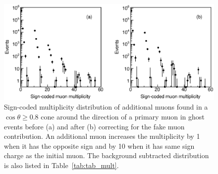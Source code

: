 \documentclass[aps,prd,preprint,floatfix,nofootinbib,superscriptaddress,showpacs,amssymb]{revtex4}
\begin{document}
 \begin{figure}
 \begin{center}
 \vspace{-0.3in}
 \leavevmode
 \includegraphics*[width=\textwidth]{fa0_14_new.eps}
 \caption[]{Sign-coded multiplicity distribution of additional muons found
            in a $\cos \theta \geq 0.8$ cone around the direction of a primary
            muon in ghost events before (a) and after (b) correcting for the
            fake muon contribution. An additional muon increases the 
            multiplicity by 1 when it  has the opposite sign and by 10 when 
            it has same sign charge as the initial muon. The background 
            subtracted distribution is also listed in
	    Table~\ref{tab:tab_mult}.}
 \label{fig:fig_14}
 \end{center}
 \end{figure}
\end{document}

